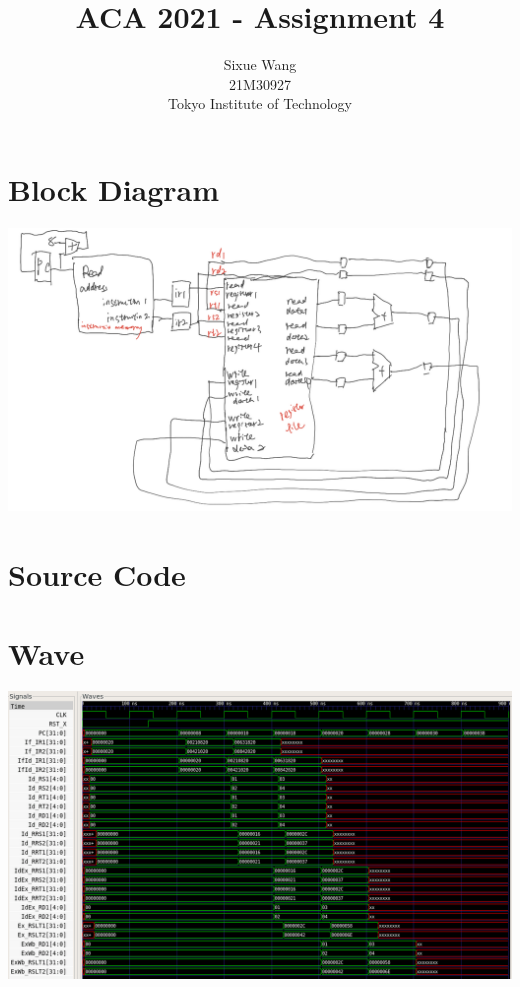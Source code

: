 \documentclass{article}
\title{ACA 2021 - Assignment 4}
\author{Sixue Wang\\21M30927\\Tokyo Institute of Technology}
\begin{document}
\maketitle

\section*{Block Diagram}
\includegraphics[width=\textwidth]{superscalar_diagram}

\section*{Source Code}


\section*{Wave}
\includegraphics[width=\textwidth]{superscalar_wave}
\end{document}
